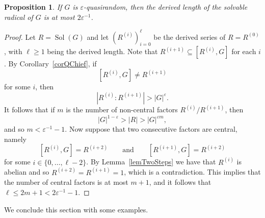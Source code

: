 \documentclass[11pt,reqno]{amsart}
\numberwithin{equation}{section}
\newtheorem{proposition}[theorem]{Proposition}
\theoremstyle{definition}
\theoremstyle{remark}
\newcommand{\Sol}{\mathop{\mathrm{Sol}}}
\begin{document}
\begin{proposition} \label{propDL} 
If $G$ is $\varepsilon$-quasirandom,
then the derived length of the solvable radical of $G$ is at most $2 \varepsilon^{-1}$.
\end{proposition}
\begin{proof}
Let $R=\Sol(G)$ and let $(R^{(i)})_{i=0}^\ell$ be the derived series of $R=R^{(0)}$,
with $\ell \geq 1$ being the derived length.
Note that $R^{(i+1)} \subseteq [R^{(i)},G]$ for each $i$.
By Corollary~\ref{corQChief}, if
$$ [R^{(i)} , G ] \neq R^{(i+1)} $$
for some $i$, then
$$ |R^{(i)}:R^{(i+1)}| > |G|^\varepsilon . $$
It follows that if $m$ is the number of non-central factors $R^{(i)}/R^{(i+1)}$, then
$$ |G|^{1-\varepsilon} > |R| > |G|^{\varepsilon m} , $$
and so $m < \varepsilon^{-1} -1$.
Now suppose that two consecutive factors are central, namely
$$ [R^{(i)},G] = R^{(i+2)} \qquad \text{and} \qquad [R^{(i+1)},G] = R^{(i+2)} $$
for some $i \in \{0,\ldots,\ell-2\}$.
By Lemma~\ref{lemTwoSteps} we have that $R^{(i)}$ is abelian and so $R^{(i+2)} = R^{(i+1)}=1$,
which is a contradiction.
This implies that the number of central factors is at most $m+1$,
and it follows that $\ell \leq 2m+1 < 2 \varepsilon^{-1} -1$.
\end{proof}

We conclude this section with some examples.
\end{document}
